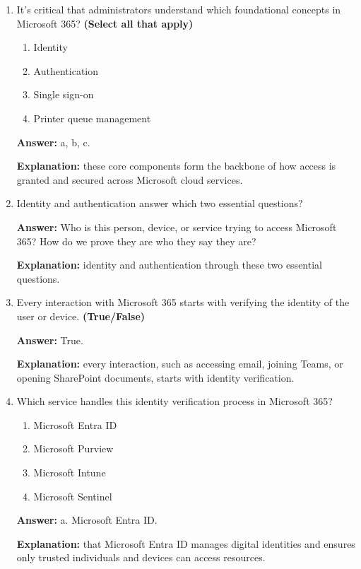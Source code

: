\documentclass[10pt]{article}
\begin{document}
\begin{enumerate}[leftmargin=*]

\item It’s critical that administrators understand which foundational concepts in Microsoft 365? \textbf{(Select all that apply)}
\begin{enumerate}[label=\alph*., leftmargin=1.5em]
\item Identity
\item Authentication
\item Single sign-on
\item Printer queue management
\end{enumerate}
\textbf{Answer:} a, b, c.

\textbf{Explanation:} these core components form the backbone of how access is granted and secured across Microsoft cloud services.

\item Identity and authentication answer which two essential questions?

\textbf{Answer:} Who is this person, device, or service trying to access Microsoft 365? How do we prove they are who they say they are?

\textbf{Explanation:} identity and authentication through these two essential questions.

\item Every interaction with Microsoft 365 starts with verifying the identity of the user or device. \textbf{(True/False)}

\textbf{Answer:} True.

\textbf{Explanation:} every interaction, such as accessing email, joining Teams, or opening SharePoint documents, starts with identity verification.

\item Which service handles this identity verification process in Microsoft 365?
\begin{enumerate}[label=\alph*., leftmargin=1.5em]
\item Microsoft Entra ID
\item Microsoft Purview
\item Microsoft Intune
\item Microsoft Sentinel
\end{enumerate}
\textbf{Answer:} a. Microsoft Entra ID.

\textbf{Explanation:} that Microsoft Entra ID manages digital identities and ensures only trusted individuals and devices can access resources.


\end{enumerate}
\end{document}
